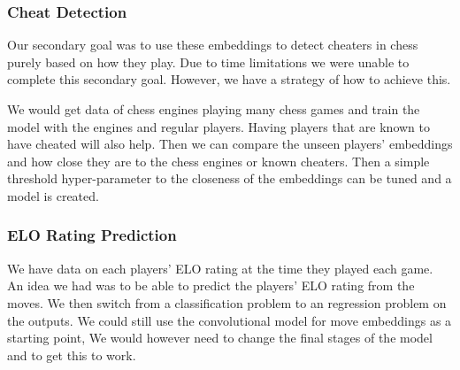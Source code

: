 \subsubsection{Cheat Detection}
Our secondary goal was to use these embeddings to detect cheaters in chess purely based on how they play. Due to time limitations we were unable to complete this secondary goal. However, we have a strategy of how to achieve this. 
\medskip\par
We would get data of chess engines playing many chess games and train the model with the engines and regular players. Having players that are known to have cheated will also help. Then we can compare the unseen players' embeddings and how close they are to the chess engines or known cheaters. Then a simple threshold hyper-parameter to the closeness of the embeddings can be tuned and a model is created.
\subsubsection{ELO Rating Prediction}
We have data on each players' ELO rating at the time they played each game. An idea we had was to be able to predict the players' ELO rating from the moves. We then switch from a classification problem to an regression problem on the outputs. We could still use the convolutional model for move embeddings as a starting point, We would however need to change the final stages of the model and to get this to work.
